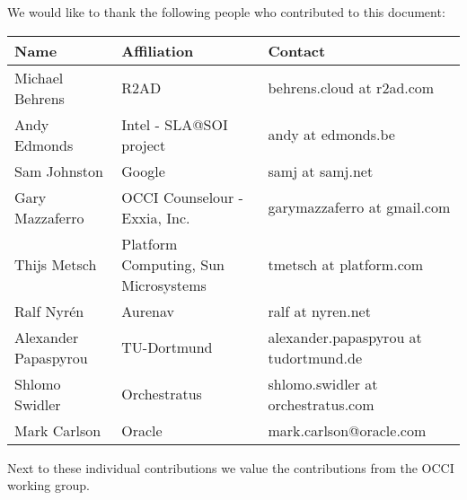 
We would like to thank the following people who contributed to this
document:

\begin{tabular}{l|p{2in}|p{2in}}
Name & Affiliation & Contact \\
\hline
Michael Behrens & R2AD & behrens.cloud at r2ad.com \\
Andy Edmonds & Intel - SLA@SOI project & andy at edmonds.be \\
Sam Johnston & Google & samj at samj.net \\
Gary Mazzaferro & OCCI Counselour - Exxia, Inc. &  garymazzaferro at gmail.com \\ 
Thijs Metsch & Platform Computing, Sun Microsystems & tmetsch at platform.com \\
Ralf Nyrén & Aurenav & ralf at nyren.net \\
Alexander Papaspyrou & TU-Dortmund & alexander.papaspyrou at tu\-dortmund.de \\
Shlomo Swidler & Orchestratus & shlomo.swidler at orchestratus.com \\
Mark Carlson & Oracle & mark.carlson@oracle.com \\
\end{tabular}

Next to these individual contributions we value the contributions from
the OCCI working group.
